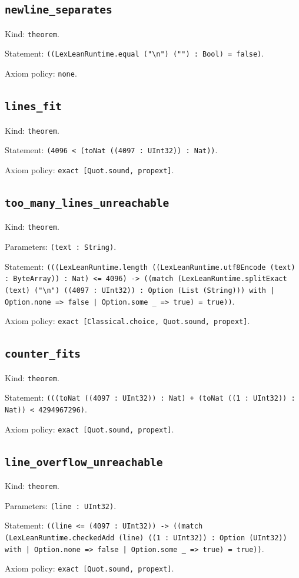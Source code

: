 \documentclass[11pt]{article}
\begin{document}
\subsection*{\texttt{newline\_separates}}
\noindent Kind: \texttt{theorem}.\par
\noindent Statement: \texttt{((LexLeanRuntime.equal ("\textbackslash{}n") ("") : Bool) = false)}.\par
\noindent Axiom policy: \texttt{none}.\par
\subsection*{\texttt{lines\_fit}}
\noindent Kind: \texttt{theorem}.\par
\noindent Statement: \texttt{(4096 < (toNat ((4097 : UInt32)) : Nat))}.\par
\noindent Axiom policy: \texttt{exact [Quot.sound, propext]}.\par
\subsection*{\texttt{too\_many\_lines\_unreachable}}
\noindent Kind: \texttt{theorem}.\par
\noindent Parameters: \texttt{(text : String)}.\par
\noindent Statement: \texttt{(((LexLeanRuntime.length ((LexLeanRuntime.utf8Encode (text) : ByteArray)) : Nat) <= 4096) -> ((match (LexLeanRuntime.splitExact (text) ("\textbackslash{}n") ((4097 : UInt32)) : Option (List (String))) with | Option.none => false | Option.some \_ => true) = true))}.\par
\noindent Axiom policy: \texttt{exact [Classical.choice, Quot.sound, propext]}.\par
\subsection*{\texttt{counter\_fits}}
\noindent Kind: \texttt{theorem}.\par
\noindent Statement: \texttt{(((toNat ((4097 : UInt32)) : Nat) + (toNat ((1 : UInt32)) : Nat)) < 4294967296)}.\par
\noindent Axiom policy: \texttt{exact [Quot.sound, propext]}.\par
\subsection*{\texttt{line\_overflow\_unreachable}}
\noindent Kind: \texttt{theorem}.\par
\noindent Parameters: \texttt{(line : UInt32)}.\par
\noindent Statement: \texttt{((line <= (4097 : UInt32)) -> ((match (LexLeanRuntime.checkedAdd (line) ((1 : UInt32)) : Option (UInt32)) with | Option.none => false | Option.some \_ => true) = true))}.\par
\noindent Axiom policy: \texttt{exact [Quot.sound, propext]}.\par
\end{document}
